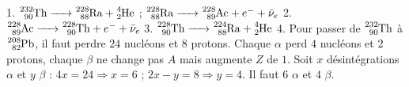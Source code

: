 1. $\ce{^{232}_{90}Th -> ^{228}_{88}Ra + ^{4}_{2}He}$ ; $\ce{^{228}_{88}Ra -> ^{228}_{89}Ac} + e^- + \bar{\nu}_e$
2. $\ce{^{228}_{89}Ac -> ^{228}_{90}Th} + e^- + \bar{\nu}_e$
3. $\ce{^{228}_{90}Th -> ^{224}_{88}Ra + ^{4}_{2}He}$
4. Pour passer de $\ce{^{232}_{90}Th}$ à $\ce{^{208}_{82}Pb}$, il faut perdre $24$ nucléons et $8$ protons. Chaque $\alpha$ perd $4$ nucléons et $2$ protons, chaque $\beta$ ne change pas $A$ mais augmente $Z$ de $1$. Soit $x$ désintégrations $\alpha$ et $y$ $\beta$ : $4x = 24 \Rightarrow x = 6$ ; $2x - y = 8 \Rightarrow y = 4$. Il faut $6$ $\alpha$ et $4$ $\beta$.